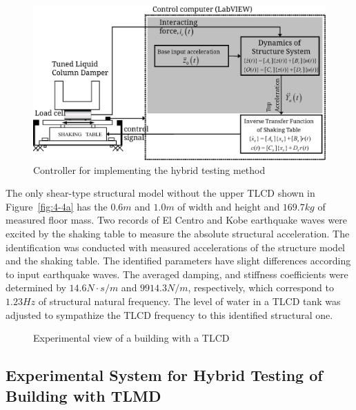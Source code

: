 \begin{figure}[ht]
\centering
\includegraphics[width=1\textwidth] {figure/4-3.eps}
\caption{Controller for implementing the hybrid testing method}
\label{fig:4-3}
\end{figure}

The only shear-type structural model without the upper TLCD shown in Figure~\ref{fig:4-4a} has the $0.6m$ and $1.0m$ of width and height and $169.7kg$ of measured floor mass. Two records of El Centro and Kobe earthquake waves were excited by the shaking table to measure the absolute structural acceleration. The identification was conducted with measured accelerations of the structure model and the shaking table. The identified parameters have slight differences according to input earthquake waves. The averaged damping, and stiffness coefficients were determined by $14.6N\cdot s/m$ and $9914.3N/m$, respectively, which correspond to $1.23Hz$ of structural natural frequency. The level of water in a TLCD tank was adjusted to sympathize the TLCD frequency to this identified structural one.

\begin{figure}[!ht]
\centering
{}
\caption{Experimental view of a building with a TLCD}
\label{fig:4-4}
\end{figure}





\clearpage
\subsection{Experimental System for Hybrid Testing of Building with TLMD}

